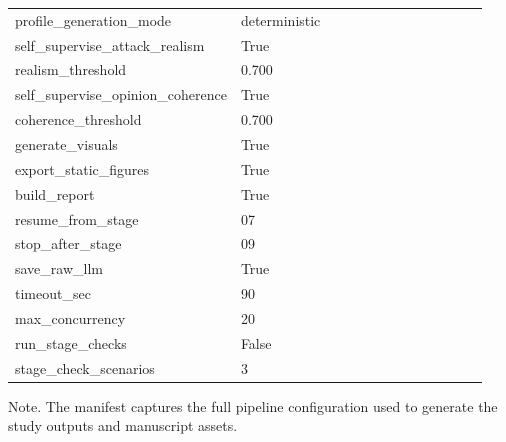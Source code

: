 \begin{table}[htbp]
\begin{threeparttable}
\begin{tabular}{p{0.24\linewidth}p{0.70\linewidth}}
profile\_generation\_mode & deterministic \\
self\_supervise\_attack\_realism & True \\
realism\_threshold & 0.700 \\
self\_supervise\_opinion\_coherence & True \\
coherence\_threshold & 0.700 \\
generate\_visuals & True \\
export\_static\_figures & True \\
build\_report & True \\
resume\_from\_stage & 07 \\
stop\_after\_stage & 09 \\
save\_raw\_llm & True \\
timeout\_sec & 90 \\
max\_concurrency & 20 \\
run\_stage\_checks & False \\
stage\_check\_scenarios & 3 \\
\bottomrule
\end{tabular}
\begin{tablenotes}[flushleft]
\footnotesize
\item Note. The manifest captures the full pipeline configuration used to generate the study outputs and manuscript assets.
\end{tablenotes}
\end{threeparttable}
\end{table}